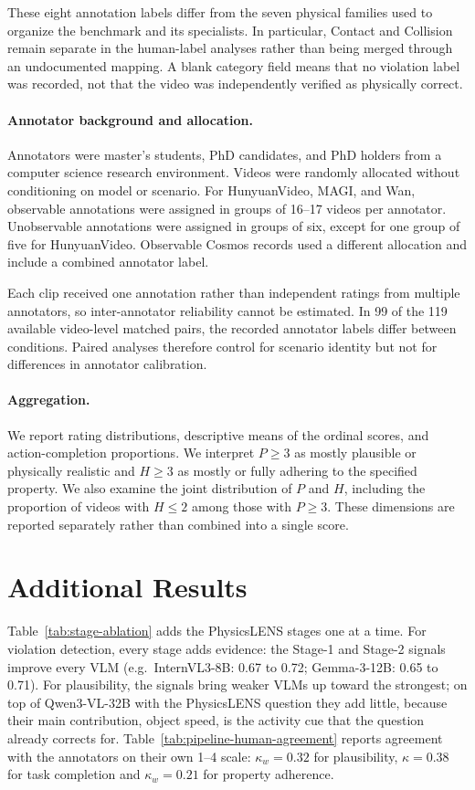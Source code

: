 These eight annotation labels differ from the seven physical families used to organize the benchmark and its specialists. In particular, Contact and Collision remain separate in the human-label analyses rather than being merged through an undocumented mapping. A blank category field means that no violation label was recorded, not that the video was independently verified as physically correct.

\paragraph{Annotator background and allocation.}
Annotators were master's students, PhD candidates, and PhD holders from a computer science research environment. Videos were randomly allocated without conditioning on model or scenario. For HunyuanVideo, MAGI, and Wan, observable annotations were assigned in groups of 16--17 videos per annotator. Unobservable annotations were assigned in groups of six, except for one group of five for HunyuanVideo. Observable Cosmos records used a different allocation and include a combined annotator label.

Each clip received one annotation rather than independent ratings from multiple annotators, so inter-annotator reliability cannot be estimated. In 99 of the 119 available video-level matched pairs, the recorded annotator labels differ between conditions. Paired analyses therefore control for scenario identity but not for differences in annotator calibration.

\paragraph{Aggregation.}
We report rating distributions, descriptive means of the ordinal scores, and action-completion proportions. We interpret $P\geq3$ as mostly plausible or physically realistic and $H\geq3$ as mostly or fully adhering to the specified property. We also examine the joint distribution of $P$ and $H$, including the proportion of videos with $H\leq2$ among those with $P\geq3$. These dimensions are reported separately rather than combined into a single score.
\section{Additional Results}
\label{app:additional-results}
Table~\ref{tab:stage-ablation} adds the PhysicsLENS stages one at a time. For violation detection, every stage adds evidence: the Stage-1 and Stage-2 signals improve every VLM (e.g.\ InternVL3-8B: 0.67 to 0.72; Gemma-3-12B: 0.65 to 0.71). For plausibility, the signals bring weaker VLMs up toward the strongest; on top of Qwen3-VL-32B with the PhysicsLENS question they add little, because their main contribution, object speed, is the activity cue that the question already corrects for. Table~\ref{tab:pipeline-human-agreement} reports agreement with the annotators on their own 1--4 scale: $\kappa_w{=}0.32$ for plausibility, $\kappa{=}0.38$ for task completion and $\kappa_w{=}0.21$ for property adherence.

